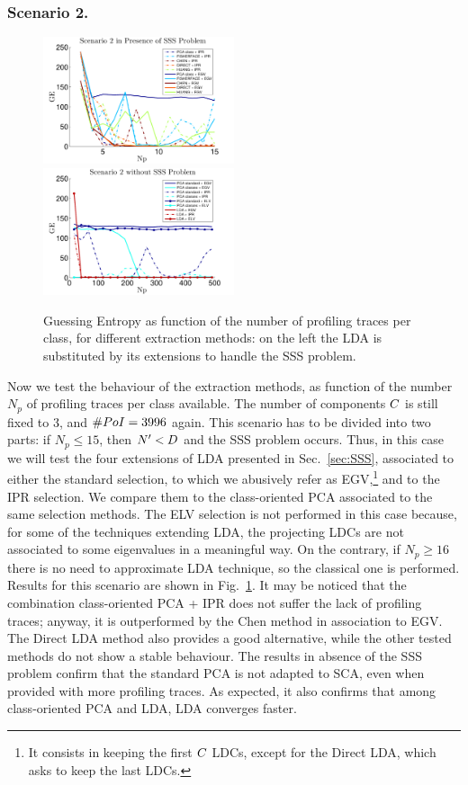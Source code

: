 \subsubsection{Scenario 2.}
\begin{figure}
\includegraphics[width=0.5\textwidth]{figures/Criterion2SSS.pdf}
\includegraphics[width=0.5\textwidth]{figures/Criterion2notSSS.pdf} 
\caption{Guessing Entropy as function of the number of profiling traces per class, for different extraction methods: on the left the LDA is substituted by its extensions to handle the SSS problem.}\label{fig:2}
\end{figure}
Now we test the behaviour of the extraction methods, as function of the number $N_p$ of profiling traces per class available. The number of components $\newTraceLength$ is still fixed to 3, and $\numPoI=3996$ again. This scenario has to be divided into two parts: if $N_p\leq 15$, then $\numTraces[]'<\traceLength$ and the SSS problem occurs. Thus, in this case we will test the four extensions of LDA presented in Sec.~\ref{sec:SSS}, associated to either the standard selection, to which we abusively refer as EGV,\footnote{It consists in keeping the first $\newTraceLength$ LDCs, except for the Direct LDA, which asks to keep the last LDCs.} and to the IPR selection.  We compare them to the class-oriented PCA associated to the same selection methods. The ELV selection is not performed in this case because, for some of the techniques extending LDA, the projecting LDCs are not associated to some eigenvalues in a meaningful way. On the contrary, if $N_p\geq 16$ there is no need to approximate LDA technique, so the classical one is performed. Results for this scenario are shown in Fig.~\ref{fig:2}. It may be noticed that the combination class-oriented PCA + IPR does not suffer the lack of profiling traces; anyway, it is outperformed by the Chen method in association to EGV. The Direct LDA method also provides a good alternative, while the other tested methods do not show a stable behaviour. The results in absence of the SSS problem confirm that the standard PCA is not adapted to SCA, even when provided with more profiling traces. As expected, it also confirms that among class-oriented PCA and LDA, LDA converges faster.


